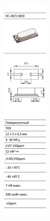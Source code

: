 \documentclass[russian, utf8, 12pt]{eskdtext}
\begin{document}
\ESKDappendix{}{}
\begin{figure} [h!]
	\centering
	\includegraphics[width = 0.2\textwidth]{resonator.pdf}
\end{figure}
\end{document}
